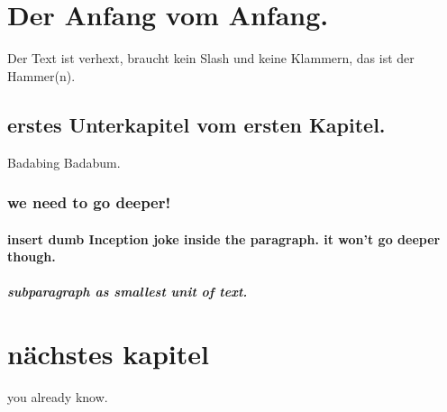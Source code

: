\documentclass{article}
\begin{document}
    
    \section{Der Anfang vom Anfang.}

    Der Text ist verhext, braucht kein Slash und keine Klammern, 
    das ist der Hammer(n).

    \subsection {erstes Unterkapitel vom ersten Kapitel.}

    Badabing Badabum.
    
    \subsubsection{we need to go deeper!}

   \paragraph{insert dumb Inception joke inside the paragraph. it won't go deeper though.} 
   \subparagraph{subparagraph as smallest unit of text.}

    \section{nächstes kapitel}

    you already know. 
\end{document}
